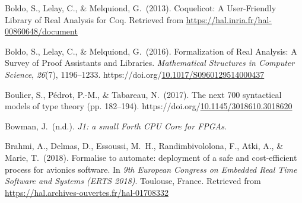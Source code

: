 \documentclass[12pt,twoside]{article}
\begin{document}
{\begin{thebibliography}{222}
Boldo, S., Lelay, C., \& Melquiond, G.~(2013). Coquelicot: A User-Friendly Library of Real Analysis for Coq. Retrieved from \href{https://hal.inria.fr/hal-00860648/document}{{\ttfamily https://\hspace{0pt}hal.\hspace{0pt}inria.\hspace{0pt}fr/\hspace{0pt}hal-\hspace{0pt}00860648/\hspace{0pt}document}}\label{boldo_coquelicot:_2013}%

Boldo, S., Lelay, C., \& Melquiond, G.~(2016). Formalization of Real Analysis: A Survey of Proof Assistants and Libraries. \emph{Mathematical Structures in Computer Science}, \emph{26}(7), 1196–1233. https://doi.org/\href{https://dx.doi.org/10.1017/S0960129514000437}{10.1017/S0960129514000437}\label{boldo_formalization_2016}%

Boulier, S., Pédrot, P.-M., \& Tabareau, N.~(2017). The next 700 syntactical models of type theory (pp. 182–194). https://doi.org/\href{https://dx.doi.org/10.1145/3018610.3018620}{10.1145/3018610.3018620}\label{boulier_next_2017}%

\mdbibitemlabel{[Bowman, n.d.]}Bowman, J.~(n.d.). \emph{J1: a small Forth CPU Core for FPGAs}.\label{bowman_j1:_nodate}%

\mdbibitemlabel{[Brahmi et al., 2018]}Brahmi, A., Delmas, D., Essoussi, M.~H., Randimbivololona, F., Atki, A., \& Marie, T.~(2018). Formalise to automate: deployment of a safe and cost-efficient process for avionics software. In \emph{9th European Congress on Embedded Real Time Software and Systems (ERTS 2018)}. Toulouse, France. Retrieved from \href{https://hal.archives-ouvertes.fr/hal-01708332}{{\ttfamily https://\hspace{0pt}hal.\hspace{0pt}archives-\hspace{0pt}ouvertes.\hspace{0pt}fr/\hspace{0pt}hal-\hspace{0pt}01708332}}\label{brahmi_formalise_2018}%


\end{thebibliography}}
\end{document}
